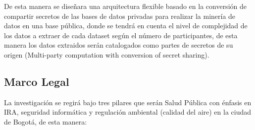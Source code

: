 \documentclass[a4paper, 11pt, oneside]{article}
\theoremstyle{definition}
\theoremstyle{remark}
\begin{document}
De esta manera se diseñara una arquitectura flexible basado en la conversión de compartir secretos de las bases de datos privadas para realizar la minería de datos en una base pública, donde se tendrá en cuenta el nivel de complejidad de los datos a extraer de cada dataset según el número de participantes, de esta manera los datos extraidos serán catalogados como partes de secretos de su origen (Multi-party computation with conversion of secret sharing).

\subsection{Marco Legal}

La investigación se regirá bajo tres pilares que serán Salud Pública con énfasis en IRA, seguridad informática y regulación ambiental (calidad del aire) en la ciudad de Bogotá, de esta manera:
\end{document}
